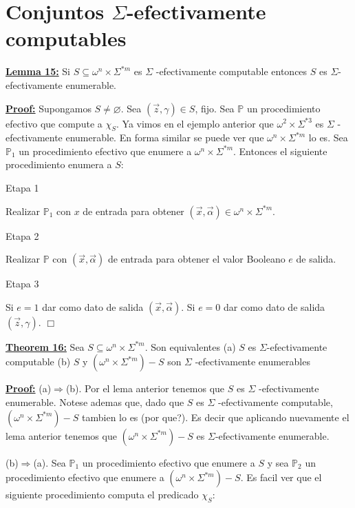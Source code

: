 \section{Conjuntos $\Sigma$-efectivamente computables}

  \textbf{\underline{Lemma 15:}} Si \(S\subseteq \omega ^{n}\times \Sigma ^{\ast m}\) es \(\Sigma \) -efectivamente computable entonces \(S\) es \(\Sigma \)-efectivamente enumerable.

  \textbf{\underline{Proof:}} Supongamos \(S\neq \varnothing \). Sea \((\vec{z},\gamma )\in S\), fijo. Sea \( \mathbb{P}\) un procedimiento efectivo que compute a \(\chi _{S}\). Ya vimos en el ejemplo anterior que \(\omega ^{2}\times \Sigma ^{\ast 3}\) es \(\Sigma \) -efectivamente enumerable. En forma similar se puede ver que \(\omega ^{n}\times \Sigma ^{\ast m}\) lo es. Sea \(\mathbb{P}_{1}\) un procedimiento efectivo que enumere a \(\omega ^{n}\times \Sigma ^{\ast m}\). Entonces el siguiente procedimiento enumera a \(S\):

Etapa 1

Realizar \(\mathbb{P}_{1}\) con \(x\) de entrada para obtener \((\vec{x} ,\vec{\alpha})\in \omega ^{n}\times \Sigma ^{\ast m}.\)

Etapa 2

Realizar \(\mathbb{P}\) con \((\vec{x},\vec{\alpha})\) de entrada para obtener el valor Booleano \(e\) de salida\(.\)

Etapa 3

Si \(e=1\) dar como dato de salida \((\vec{x},\vec{\alpha}).\) Si \(e=0\) dar como dato de salida \((\vec{z},\gamma )\). \(\Box\)


  \textbf{\underline{Theorem 16:}} Sea \(S\subseteq \omega ^{n}\times \Sigma ^{\ast m}\). Son equivalentes
  (a) \(S\) es \(\Sigma \)-efectivamente computable
  (b) \(S\) y \((\omega ^{n}\times \Sigma ^{\ast m})-S\) son \(\Sigma \) -efectivamente enumerables

  \textbf{\underline{Proof:}} (a)\(\Rightarrow \)(b). Por el lema anterior tenemos que \(S\) es \(\Sigma \) -efectivamente enumerable. Notese ademas que, dado que \(S\) es \(\Sigma \) -efectivamente computable, \((\omega ^{n}\times \Sigma ^{\ast m})-S\) tambien lo es (por que?). Es decir que aplicando nuevamente el lema anterior tenemos que \((\omega ^{n}\times \Sigma ^{\ast m})-S\) es \(\Sigma \)-efectivamente enumerable.

(b)\(\Rightarrow \)(a). Sea \(\mathbb{P}_{1}\) un procedimiento efectivo que enumere a \(S\) y sea \(\mathbb{P}_{2}\) un procedimiento efectivo que enumere a \((\omega ^{n}\times \Sigma ^{\ast m})-S\). Es facil ver que el siguiente procedimiento computa el predicado \(\chi _{S}\):

